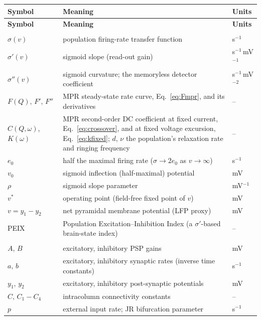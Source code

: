 \documentclass[11pt,a4paper]{article}
\newcommand{\Sig}{\sigma}
\begin{document}
\renewcommand{\arraystretch}{1.18}
{\footnotesize
\begin{longtable}{@{}>{\raggedright\arraybackslash}p{} >{\raggedright\arraybackslash}p{} >{\raggedright\arraybackslash}p{}@{}}
\toprule
\textbf{Symbol} & \textbf{Meaning} & \textbf{Units} \\
\midrule
\endfirsthead
\toprule
\textbf{Symbol} & \textbf{Meaning} & \textbf{Units} \\
\midrule
\endhead
\midrule \multicolumn{3}{@{}l}{\textit{Firing-rate nonlinearity (sigmoid)}} \\*
$\Sig(v)$ & population firing-rate transfer function & s$^{-1}$ \\
$\Sig'(v)$ & sigmoid slope (read-out gain) & s$^{-1}$\,mV$^{-1}$ \\
$\Sig''(v)$ & sigmoid curvature; the memoryless detector coefficient & s$^{-1}$\,mV$^{-2}$ \\
$F(Q),\,F',\,F''$ & MPR steady-state rate curve, Eq.~\eqref{eq:Fmpr}, and its derivatives & -- \\
$C(Q,\omega)$, $K(\omega)$ & MPR second-order DC coefficient at fixed current, Eq.~\eqref{eq:crossover}, and at fixed voltage excursion, Eq.~\eqref{eq:kfixed}; $d$, $\nu$ the population's relaxation rate and ringing frequency & -- \\
$e_0$ & half the maximal firing rate ($\Sig\!\to\!2e_0$ as $v\!\to\!\infty$) & s$^{-1}$ \\
$v_0$ & sigmoid inflection (half-maximal) potential & mV \\
$\rho$ & sigmoid slope parameter & mV$^{-1}$ \\
$v^{*}$ & operating point (field-free fixed point of $v$) & mV \\
$v=y_1-y_2$ & net pyramidal membrane potential (LFP proxy) & mV \\
PEIX & Population Excitation--Inhibition Index (a $\Sig'$-based brain-state index) & -- \\
\midrule \multicolumn{3}{@{}l}{\textit{Single-column Jansen--Rit}} \\*
$A,\,B$ & excitatory, inhibitory PSP gains & mV \\
$a,\,b$ & excitatory, inhibitory synaptic rates (inverse time constants) & s$^{-1}$ \\
$y_1,\,y_2$ & excitatory, inhibitory post-synaptic potentials & mV \\
$C,\,C_1\!-\!C_4$ & intracolumn connectivity constants & -- \\
$p$ & external input rate; JR bifurcation parameter & s$^{-1}$ \\

\end{longtable}}
\end{document}
